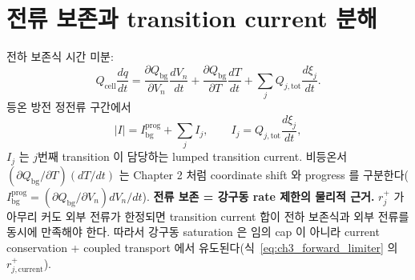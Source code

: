 \documentclass[11pt,a4paper]{article}
\newcommand{\tot}{\mathrm{tot}}
\newcommand{\bg}{\mathrm{bg}}
\newcommand{\cell}{\mathrm{cell}}
\begin{document}
\section{전류 보존과 transition current 분해}\label{sec:ch3_current}
전하 보존식 시간 미분:
\begin{equation}
Q_\cell\frac{dq}{dt}=\frac{\partial Q_\bg}{\partial V_n}\frac{dV_n}{dt}+\frac{\partial Q_\bg}{\partial T}\frac{dT}{dt}+\sum_j Q_{j,\tot}\frac{d\xi_j}{dt}.
\label{eq:ch3_current_balance}
\end{equation}
등온 방전 정전류 구간에서
\begin{equation}
|I|=I_\bg^{\mathrm{prog}}+\sum_j I_j,\qquad I_j=Q_{j,\tot}\frac{d\xi_j}{dt},
\label{eq:ch3_current_decomp}
\end{equation}
$I_j$ 는 $j$번째 transition 이 담당하는 lumped transition current. 비등온서 $(\partial Q_\bg/\partial T)(dT/dt)$ 는
Chapter 2 처럼 coordinate shift 와 progress 를 구분한다($I_\bg^{\mathrm{prog}}=(\partial Q_\bg/\partial V_n)dV_n/dt$).
\textbf{전류 보존 = 강구동 rate 제한의 물리적 근거.} $r_j^+$ 가 아무리 커도 외부 전류가 한정되면 transition
current 합이 전하 보존식과 외부 전류를 동시에 만족해야 한다. 따라서 강구동 saturation 은 임의 cap 이 아니라
current conservation + coupled transport 에서 유도된다(식~\eqref{eq:ch3_forward_limiter} 의
$r_{j,\mathrm{current}}^+$).

\end{document}
